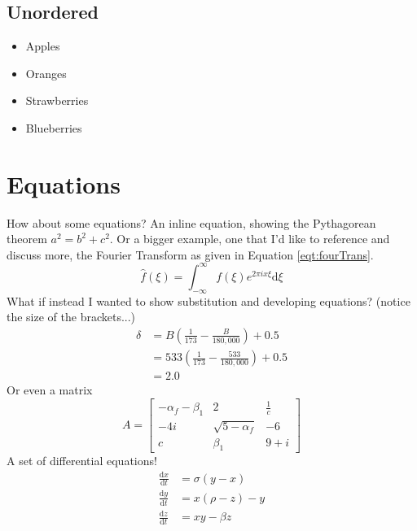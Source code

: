 \documentclass[titlepage, hidelinks, 12pt]{article}%
\begin{document}
        \subsection{Unordered}
            \begin{itemize}
                \item Apples
                \item Oranges
                \item Strawberries
                \item Blueberries
            \end{itemize}

    \section{Equations}
        How about some equations? An inline equation, showing the Pythagorean theorem \(a^{2} = b^{2} + c^{2}\).
        Or a bigger example, one that I'd like to reference and discuss more, the Fourier Transform as given in Equation \ref{eqt:fourTrans}.
        \begin{equation}
            \hat{f}\left(\xi\right) = \int_{-\infty}^{\infty}f\left(\xi\right)e^{2\pi ix\xi}\text{d}\xi
            \label{eqt:fourTrans}
        \end{equation}
        What if instead I wanted to show substitution and developing equations? (notice the size of the brackets...)
        \begin{align}
            \delta & = B\left(\frac{1}{173} - \frac{B}{180,000}\right) + 0.5\nonumber      \\
                   & = 533\left(\frac{1}{173} - \frac{533}{180,000}\right) + 0.5 \nonumber \\
                   & = 2.0 \nonumber
        \end{align}
        Or even a matrix
        \begin{equation*}
            A =
            \begin{bmatrix}
                -\alpha_f-\beta_1 & 2                 & \frac{1}{c} \\
                -4i               & \sqrt{5-\alpha_f} & -6          \\
                c                 & \beta_1           & 9 + i
            \end{bmatrix}
        \end{equation*}
        A set of differential equations!
        \begin{align}
            \frac{\text{d}x}{\text{d}t} &= \sigma (y-x)\\
            \frac{\text{d}y}{\text{d}t} &= x(\rho -z)-y\\
            \frac{\text{d}z}{\text{d}t} &= xy-\beta z
        \end{align}
\end{document}
